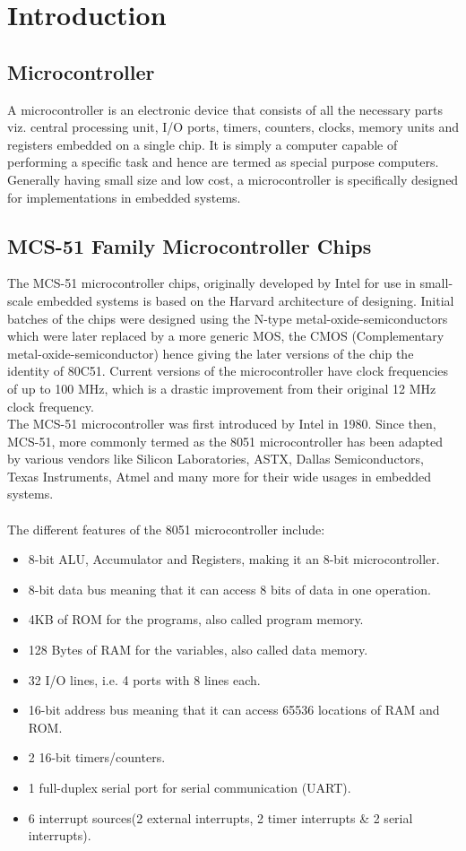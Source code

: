 \documentclass{lab_sheet}
\begin{document}
\tableofcontents
\pagebreak
\listoffigures
\pagebreak
\lstlistoflistings
\pagebreak
{}
\section{Introduction} 
\subsection{Microcontroller}
A microcontroller is an electronic device that consists of all the necessary parts viz. central processing unit, I/O ports, timers, counters, clocks, memory units and registers embedded on a single chip. It is simply a computer capable of performing a specific task and hence are termed as special purpose computers. Generally having small size and low cost, a microcontroller is specifically designed for implementations in embedded systems.
\subsection{MCS-51 Family Microcontroller Chips}
The MCS-51 microcontroller chips, originally developed by Intel for
 use in small-scale embedded systems is based on the Harvard architecture of 
 designing. Initial batches of the chips were designed using the N-type 
 metal-oxide-semiconductors which were later replaced by a more generic MOS, 
 the CMOS (Complementary metal-oxide-semiconductor) hence giving the later 
 versions of the chip the identity of 80C51. Current versions of the microcontroller have clock frequencies of up to 100 MHz, 
which is a drastic improvement from their original 12 MHz clock frequency.\\
The MCS-51 microcontroller was first introduced by Intel in 1980. Since then, 
MCS-51, more commonly termed as the 8051 microcontroller has been adapted by 
various vendors like Silicon Laboratories, ASTX, Dallas Semiconductors, Texas Instruments,
 Atmel and many more for their wide usages in embedded systems.\\\\
The different features of the 8051 microcontroller include:
\begin{itemize}
\item 8-bit ALU, Accumulator and Registers, making it an 8-bit microcontroller.
\item 8-bit data bus meaning that it can access 8 bits of data in one operation.
\item 4KB of ROM for the programs, also called program memory.
\item 128 Bytes of RAM for the variables, also called data memory.
\item 32 I/O lines, i.e. 4 ports with 8 lines each.
\item 16-bit address bus meaning that it can access 65536 locations of RAM and ROM.
\item 2 16-bit timers/counters.
\item 1 full-duplex serial port for serial communication (UART).
\item 6 interrupt sources(2 external interrupts, 2 timer interrupts \& 2 serial interrupts).
\end{itemize}
\end{document}
